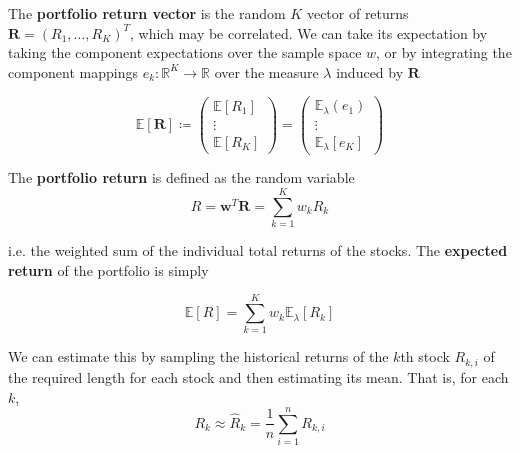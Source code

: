 \documentclass{article}
\begin{document}
  \begin{definition}
    The \textbf{portfolio return vector} is the random $K$ vector of returns $\mathbf{R} = (R_1, \ldots, R_K)^T$, which may be correlated. We can take its expectation by taking the component expectations over the sample space $w$, or by integrating the component mappings $e _k: \mathbb{R}^K \rightarrow \mathbb{R}$ over the measure $\lambda$ induced by $\mathbf{R}$ 

    \begin{equation}
      \mathbb{E}[\mathbf{R}] \coloneqq \begin{pmatrix} \mathbb{E} [R_1] \\ \vdots \\ \mathbb{E} [R_K] \end{pmatrix} = \begin{pmatrix} \mathbb{E}_\lambda(e_1) \\ \vdots \\ \mathbb{E}_\lambda [e_K] \end{pmatrix}
    \end{equation}

    The \textbf{portfolio return} is defined as the random variable 
    \begin{equation}
      R = \mathbf{w}^T \mathbf{R} = \sum_{k=1}^K w_{k} R_k
    \end{equation}

    i.e. the weighted sum of the individual total returns of the stocks. The \textbf{expected return} of the portfolio is simply 

    \begin{equation}
      \mathbb{E}[R] = \sum_{k=1}^K w_k \mathbb{E}_\lambda [R_k]
    \end{equation}

    We can estimate this by sampling the historical returns of the $k$th stock $R_{k, i}$ of the required length for each stock and then estimating its mean. That is, for each $k$, 
    \begin{equation}
      R_k \approx \hat{R}_k = \frac{1}{n} \sum_{i = 1}^n R_{k, i}
    \end{equation}
  \end{definition}
\end{document}
